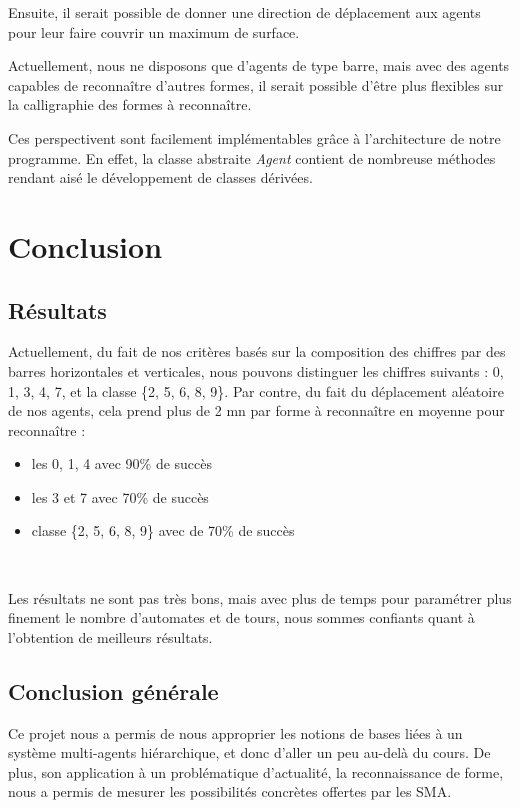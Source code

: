 \documentclass[a4paper,12pt]{report}
\begin{document}
Ensuite, il serait possible de donner une direction de déplacement aux agents pour leur faire couvrir un maximum de surface.

Actuellement, nous ne disposons que d'agents de type \og{}barre\fg{}, mais avec des agents capables de reconnaître d'autres formes, il serait possible d'être plus flexibles sur la calligraphie des formes à reconnaître.

Ces perspectivent sont facilement implémentables grâce à l'architecture de notre programme. En effet, la classe abstraite \emph{Agent} contient de nombreuse méthodes rendant aisé le développement de classes dérivées.





\chapter{Conclusion}
\section{Résultats}
Actuellement, du fait de nos critères basés sur la composition des chiffres par des barres horizontales et verticales, nous pouvons distinguer les chiffres suivants : 0, 1, 3, 4, 7, et la classe \{2, 5, 6, 8, 9\}. Par contre, du fait du déplacement aléatoire de nos agents, cela prend plus de 2 mn par forme à reconnaître en moyenne pour reconnaître :
\begin{itemize}
 \item les 0, 1, 4 avec 90\% de succès
 \item les 3 et 7 avec 70\% de succès
 \item classe \{2, 5, 6, 8, 9\} avec de 70\% de succès
\end{itemize}

~

Les résultats ne sont pas très bons, mais avec plus de temps pour paramétrer plus finement le nombre d'automates et de tours, nous sommes confiants quant à l'obtention de meilleurs résultats.


\section{Conclusion générale}
Ce projet nous a permis de nous approprier les notions de bases liées à un système multi-agents hiérarchique, et donc d'aller un peu au-delà du cours. De plus, son application à un problématique d'actualité, la reconnaissance de forme, nous  a permis de mesurer les possibilités concrètes offertes par les SMA.
\end{document}
